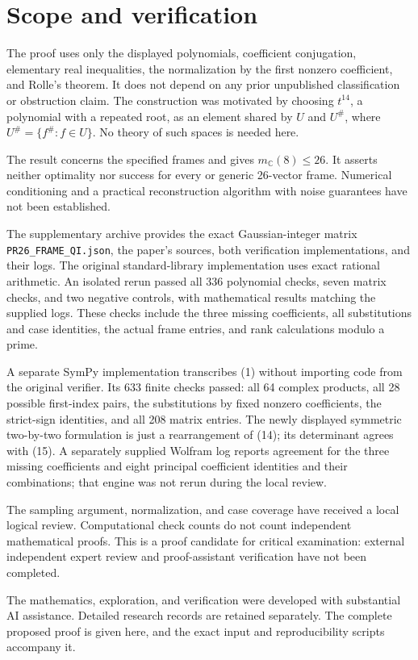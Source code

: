\begingroup\small

\section{Scope and verification}\label{scope-and-verification}

The proof uses only the displayed polynomials, coefficient conjugation,
elementary real inequalities, the normalization by the first nonzero
coefficient, and Rolle's theorem. It does not depend on any prior
unpublished classification or obstruction claim. The construction was
motivated by choosing \(t^{14}\), a polynomial with a repeated root, as
an element shared by \(U\) and \(U^\#\), where \(U^\#=\{f^\#:f\in U\}\).
No theory of such spaces is needed here.

The result concerns the specified frames and gives
\(m_{\mathbb C}(8)\le26\). It asserts neither optimality nor success for
every or generic 26-vector frame. Numerical conditioning and a practical
reconstruction algorithm with noise guarantees have not been
established.

The supplementary archive provides the exact Gaussian-integer matrix
\texttt{PR26\_FRAME\_QI.json}, the paper's sources, both verification
implementations, and their logs. The original standard-library
implementation uses exact rational arithmetic. An isolated rerun passed
all 336 polynomial checks, seven matrix checks, and two negative
controls, with mathematical results matching the supplied logs. These
checks include the three missing coefficients, all substitutions and
case identities, the actual frame entries, and rank calculations modulo
a prime.

A separate SymPy implementation transcribes (1) without importing code
from the original verifier. Its 633 finite checks passed: all 64 complex
products, all 28 possible first-index pairs, the substitutions by fixed
nonzero coefficients, the strict-sign identities, and all 208 matrix
entries. The newly displayed symmetric two-by-two formulation is just a
rearrangement of (14); its determinant agrees with (15). A separately
supplied Wolfram log reports agreement for the three missing
coefficients and eight principal coefficient identities and their
combinations; that engine was not rerun during the local review.

The sampling argument, normalization, and case coverage have received a
local logical review. Computational check counts do not count
independent mathematical proofs. This is a proof candidate for critical
examination: external independent expert review and proof-assistant
verification have not been completed.

The mathematics, exploration, and verification were developed with
substantial AI assistance. Detailed research records are retained
separately. The complete proposed proof is given here, and the exact
input and reproducibility scripts accompany it.

\endgroup
